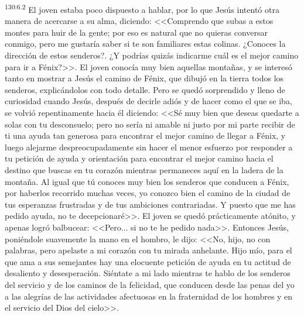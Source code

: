 \par 
\textsuperscript{130:6.2} El joven estaba poco dispuesto a hablar, por lo que Jesús intentó otra manera de acercarse a su alma, diciendo: <<Comprendo que subas a estos montes para huir de la gente; por eso es natural que no quieras conversar conmigo, pero me gustaría saber si te son familiares estas colinas. ¿Conoces la dirección de estos senderos?. ¿Y podrías quizás indicarme cuál es el mejor camino para ir a Fénix?>>. El joven conocía muy bien aquellas montañas, y se interesó tanto en mostrar a Jesús el camino de Fénix, que dibujó en la tierra todos los senderos, explicándolos con todo detalle. Pero se quedó sorprendido y lleno de curiosidad cuando Jesús, después de decirle adiós y de hacer como el que se iba, se volvió repentinamente hacia él diciendo: <<Sé muy bien que deseas quedarte a solas con tu desconsuelo; pero no sería ni amable ni justo por mi parte recibir de ti una ayuda tan generosa para encontrar el mejor camino de llegar a Fénix, y luego alejarme despreocupadamente sin hacer el menor esfuerzo por responder a tu petición de ayuda y orientación para encontrar el mejor camino hacia el destino que buscas en tu corazón mientras permaneces aquí en la ladera de la montaña. Al igual que tú conoces muy bien los senderos que conducen a Fénix, por haberlos recorrido muchas veces, yo conozco bien el camino de la ciudad de tus esperanzas frustradas y de tus ambiciones contrariadas. Y puesto que me has pedido ayuda, no te decepcionaré>>. El joven se quedó prácticamente atónito, y apenas logró balbucear: <<Pero... si no te he pedido nada>>. Entonces Jesús, poniéndole suavemente la mano en el hombro, le dijo: <<No, hijo, no con palabras, pero apelaste a mi corazón con tu mirada anhelante. Hijo mío, para el que ama a sus semejantes hay una elocuente petición de ayuda en tu actitud de desaliento y desesperación. Siéntate a mi lado mientras te hablo de los senderos del servicio y de los caminos de la felicidad, que conducen desde las penas del yo a las alegrías de las actividades afectuosas en la fraternidad de los hombres y en el servicio del Dios del cielo>>.

